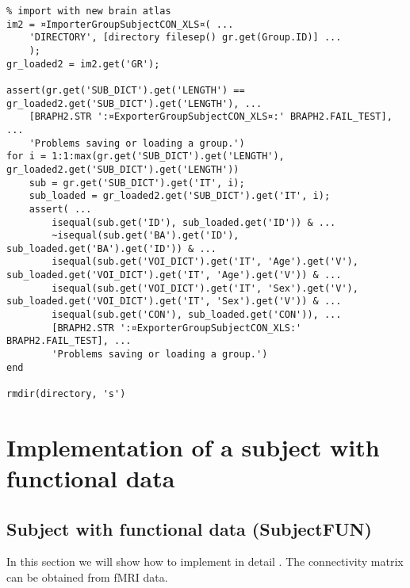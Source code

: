 \documentclass{tufte-handout}
\begin{document}
\begin{lstlisting}
% import with new brain atlas
im2 = ¤ImporterGroupSubjectCON_XLS¤( ...
    'DIRECTORY', [directory filesep() gr.get(Group.ID)] ...
    );
gr_loaded2 = im2.get('GR');

assert(gr.get('SUB_DICT').get('LENGTH') == gr_loaded2.get('SUB_DICT').get('LENGTH'), ...
	[BRAPH2.STR ':¤ExporterGroupSubjectCON_XLS¤:' BRAPH2.FAIL_TEST], ...
    'Problems saving or loading a group.')
for i = 1:1:max(gr.get('SUB_DICT').get('LENGTH'), gr_loaded2.get('SUB_DICT').get('LENGTH'))
    sub = gr.get('SUB_DICT').get('IT', i);
    sub_loaded = gr_loaded2.get('SUB_DICT').get('IT', i);    
    assert( ...
        isequal(sub.get('ID'), sub_loaded.get('ID')) & ...
        ~isequal(sub.get('BA').get('ID'), sub_loaded.get('BA').get('ID')) & ...
        isequal(sub.get('VOI_DICT').get('IT', 'Age').get('V'), sub_loaded.get('VOI_DICT').get('IT', 'Age').get('V')) & ... 
        isequal(sub.get('VOI_DICT').get('IT', 'Sex').get('V'), sub_loaded.get('VOI_DICT').get('IT', 'Sex').get('V')) & ...
        isequal(sub.get('CON'), sub_loaded.get('CON')), ...
        [BRAPH2.STR ':¤ExporterGroupSubjectCON_XLS:' BRAPH2.FAIL_TEST], ...
        'Problems saving or loading a group.')    
end

rmdir(directory, 's')
\end{lstlisting}

\clearpage

\section{Implementation of a subject with functional data}

\subsection{Subject with functional data (SubjectFUN)}

In this section we will show how to implement in detail . The connectivity matrix can be obtained from fMRI data.
\end{document}
